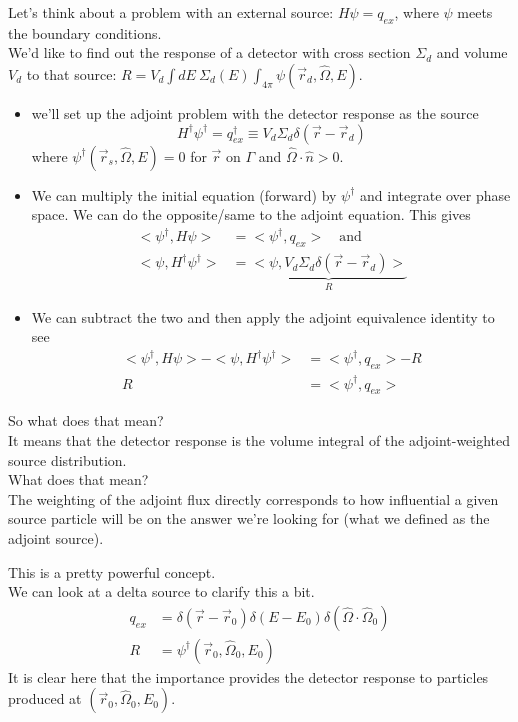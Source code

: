 \documentclass[12pt]{article}
\newcommand{\rvec}{\ensuremath{\vec{r}}}
\newcommand{\vOmega}{\ensuremath{\hat{\Omega}}}
\begin{document}
Let's think about a problem with an external source: $H \psi = q_{ex}$, where $\psi$ meets the boundary conditions.\\
We'd like to find out the response of a detector with cross section $\Sigma_d$ and volume $V_d$ to that source: $R = V_d \int dE\: \Sigma_d(E) \int_{4\pi} \psi(\rvec_d, \vOmega, E)$. \\
\begin{itemize}
\item we'll set up the adjoint problem with the detector response as the source
\[H^{\dagger}\psi^{\dagger} = q_{ex}^{\dagger} \equiv V_d \Sigma_d \delta(\rvec - \rvec_d)\]
where $\psi^{\dagger}(\vec{r}_s, \vOmega, E) = 0$ for $\rvec$ on $\Gamma$ and $\vOmega \cdot \hat{n} > 0$.
%
\item We can multiply the initial equation (forward) by $\psi^{\dagger}$ and integrate over phase space. We can do the opposite/same to the adjoint equation. This gives
\begin{align*}
<\psi^{\dagger}, H\psi> &= <\psi^{\dagger}, q_{ex}> \quad \text{and}\\
<\psi, H^{\dagger} \psi^{\dagger}> &= \underbrace{<\psi, V_d \Sigma_d \delta(\rvec - \rvec_d)> }_R
\end{align*}
%
\item We can subtract the two and then apply the adjoint equivalence identity to see
\begin{align*}
<\psi^{\dagger}, H\psi> - <\psi, H^{\dagger} \psi^{\dagger}> &= <\psi^{\dagger}, q_{ex}> - R \\
R &= <\psi^{\dagger}, q_{ex}>
\end{align*}
\end{itemize}
%
So what does that mean? \\
It means that the detector response is the volume integral of the adjoint-weighted source distribution. \\
What does that mean? \\
The weighting of the adjoint flux directly corresponds to how influential a given source particle will be on the answer we're looking for (what we defined as the adjoint source).

This is a pretty powerful concept. \\
We can look at a delta source to clarify this a bit.
\begin{align*}
q_{ex} &= \delta(\rvec - \rvec_0) \delta(E - E_0) \delta(\vOmega \cdot \vOmega_0) \\
R &= \psi^{\dagger}(\rvec_0, \vOmega_0, E_0)
\end{align*}
It is clear here that the importance provides the detector response to particles produced at $(\rvec_0, \vOmega_0, E_0)$.
\end{document}
